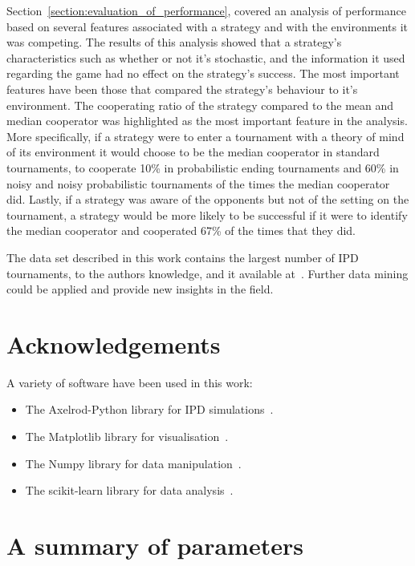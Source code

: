 \documentclass{article}
\begin{document}
Section~\ref{section:evaluation_of_performance}, covered an analysis of
performance based on several features associated with a strategy and with the
environments it was competing. The results of this analysis showed that a
strategy's characteristics such as whether or not it's stochastic, and the information it
used regarding the game had no effect on the strategy's success. The most
important features have been those that compared the strategy's behaviour to it's
environment. The cooperating ratio of the strategy compared to the mean and
median cooperator was highlighted as the most important feature in the analysis.
More specifically, if a strategy were to enter a tournament with a theory of
mind of its environment it would choose to be the median cooperator in standard
tournaments, to cooperate 10\% in probabilistic ending tournaments and 
60\% in noisy and noisy probabilistic
tournaments of the times the median cooperator did. Lastly, if a strategy was aware of the opponents but not of the
setting on the tournament, a strategy would be more likely to be successful if
it were to identify the median cooperator and cooperated 67\% of the times that
they did.

The data set described in this work contains the largest number of IPD tournaments,
to the authors knowledge, and it available at~\cite{data}. Further data mining
could be applied and provide new insights in the field.




\section{Acknowledgements}

A variety of software have been used in this work:

\begin{itemize}
    \item The Axelrod-Python library for IPD simulations~\cite{axelrodproject}.
    \item The Matplotlib library for visualisation~\cite{hunter2007matplotlib}.
    \item The Numpy library for data manipulation~\cite{walt2011numpy}.
    \item The scikit-learn library for data analysis~\cite{scikit-learn}.
\end{itemize}

\appendix

\section{A summary of parameters}\label{app:parameters}
\end{document}
